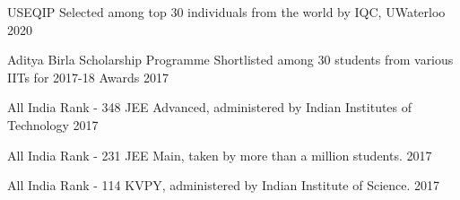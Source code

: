 
\begin{cvhonors}

  \cvhonor
    {USEQIP} %
    {Selected among top 30 individuals from the world by IQC, UWaterloo} %
    {} %
    {2020} %

  \cvhonor
    {Aditya Birla Scholarship Programme} %
    {Shortlisted among 30 students from various IITs for 2017-18 Awards} %
    {} %
    {2017} %

  \cvhonor
    {All India Rank - 348} %
    {JEE Advanced, administered by Indian Institutes of Technology} %
    {} %
    {2017} %
    
  \cvhonor
    {All India Rank - 231} %
    {JEE Main, taken by more than a million students.} %
    {} %
    {2017} %

  \cvhonor
    {All India Rank - 114} %
    {KVPY, administered by Indian Institute of Science.} %
    {} %
    {2017} %

\end{cvhonors}